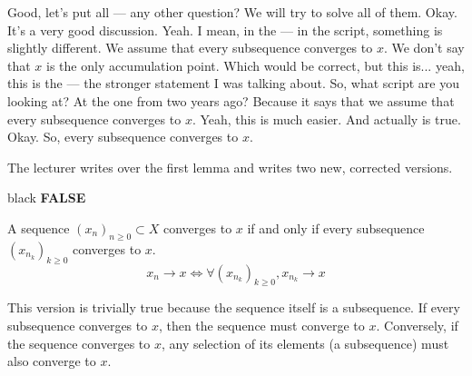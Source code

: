 \begin{spoken-clean}[00:11:24 - 00:13:40]
Good, let's put all — any other question? We will try to solve all of them. Okay. It's a very good discussion. Yeah. I mean, in the — in the script, something is slightly different. We assume that every subsequence converges to $x$. We don't say that $x$ is the only accumulation point. Which would be correct, but this is... yeah, this is the — the stronger statement I was talking about. So, what script are you looking at? At the one from two years ago? Because it says that we assume that every subsequence converges to $x$. Yeah, this is much easier. And actually is true. Okay. So, every subsequence converges to $x$.
\end{spoken-clean}

\begin{nice-box}
The lecturer writes  over the first lemma and writes two new, corrected versions.
\end{nice-box}
\begin{color-box}{black}
\textbf{FALSE}
\end{color-box}
\begin{math-stroke}
\begin{lemma*}\label{lem:convergence-acc-point-v2}
A sequence $(x_n)_{n \ge 0} \subset X$ converges to $x$ if and only if every subsequence $(x_{n_k})_{k \ge 0}$ converges to $x$.
\[ x_n \to x \iff \forall (x_{n_k})_{k \ge 0}, x_{n_k} \to x \]
\end{lemma*}

\begin{explanation-of-steps}
This version is trivially true because the sequence itself is a subsequence. If every subsequence converges to $x$, then the sequence must converge to $x$. Conversely, if the sequence converges to $x$, any selection of its elements (a subsequence) must also converge to $x$.
\end{explanation-of-steps}
\end{math-stroke}


